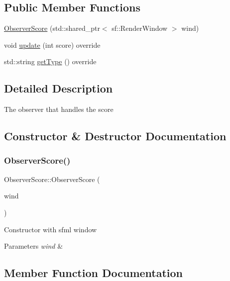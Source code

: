 \subsection*{Public Member Functions}
\begin{DoxyCompactItemize}
\item 
\hyperlink{classObserverScore_aa0913a7e696f26eb26934bb30a90a6f6}{Observer\+Score} (std\+::shared\+\_\+ptr$<$ sf\+::\+Render\+Window $>$ wind)
\item 
void \hyperlink{classObserverScore_a1cb10ae5056c103436e00158cf90d5e4}{update} (int score) override
\item 
std\+::string \hyperlink{classObserverScore_a88ee2b9fe8b49edf234f6c05aa242724}{get\+Type} () override
\end{DoxyCompactItemize}


\subsection{Detailed Description}
The observer that handles the score 

\subsection{Constructor \& Destructor Documentation}
\mbox{\label{classObserverScore_aa0913a7e696f26eb26934bb30a90a6f6}} 
\subsubsection{\texorpdfstring{Observer\+Score()}{ObserverScore()}}
{\footnotesize\ttfamily Observer\+Score\+::\+Observer\+Score (\begin{DoxyParamCaption}\item[{std\+::shared\+\_\+ptr$<$ sf\+::\+Render\+Window $>$}]{wind }\end{DoxyParamCaption})}

Constructor with sfml window 
\begin{DoxyParams}{Parameters}
{\em wind} & \\
\hline
\end{DoxyParams}


\subsection{Member Function Documentation}
\mbox{\label{classObserverScore_a88ee2b9fe8b49edf234f6c05aa242724}} 
